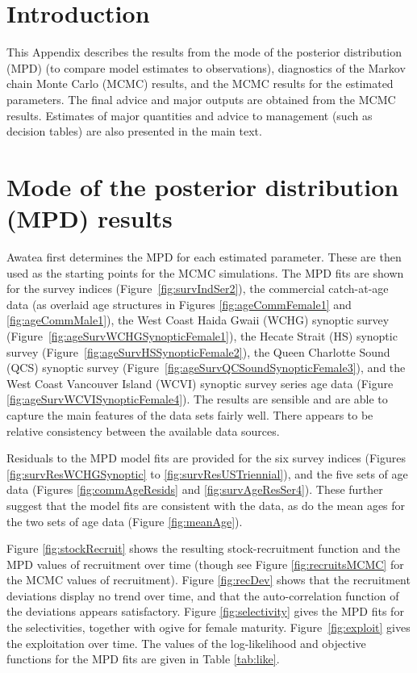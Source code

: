
\section{Introduction}

This Appendix describes the results from the mode of the posterior distribution (MPD) (to compare model estimates to observations), diagnostics of the Markov chain Monte Carlo (MCMC) results, and the MCMC results for the estimated parameters.  The final advice and major outputs are obtained from the MCMC results. Estimates of major quantities and advice to management (such as decision tables) are also presented in the main text.


\section{Mode of the posterior distribution (MPD) results}

Awatea first determines the MPD for each estimated parameter.  These are then used as the starting points for the MCMC simulations. The MPD fits are shown for the survey indices (Figure~\ref{fig:survIndSer2}), the commercial catch-at-age data (as overlaid age structures in Figures \ref{fig:ageCommFemale1} and \ref{fig:ageCommMale1}), the West Coast Haida Gwaii (WCHG) synoptic survey (Figure~\ref{fig:ageSurvWCHGSynopticFemale1}), the Hecate Strait (HS) synoptic survey (Figure~\ref{fig:ageSurvHSSynopticFemale2}), the Queen Charlotte Sound (QCS) synoptic survey (Figure~\ref{fig:ageSurvQCSoundSynopticFemale3}), and the West Coast Vancouver Island (WCVI) synoptic survey series age data (Figure \ref{fig:ageSurvWCVISynopticFemale4}). The results are sensible and are able to capture the main features of the data sets fairly well. There appears to be relative consistency between the available data sources.

Residuals to the MPD model fits are provided for the six survey indices (Figures \ref{fig:survResWCHGSynoptic} to \ref{fig:survResUSTriennial}), and the five sets of age data (Figures \ref{fig:commAgeResids} and \ref{fig:survAgeResSer4}). These further suggest that the model fits are consistent with the data, as do the mean ages for the two sets of age data (Figure \ref{fig:meanAge}).

Figure \ref{fig:stockRecruit} shows the resulting stock-recruitment function and the MPD values of recruitment over time (though see Figure \ref{fig:recruitsMCMC} for the MCMC values of recruitment). Figure \ref{fig:recDev} shows that the recruitment deviations display no trend over time, and that the auto-correlation function of the deviations appears satisfactory. Figure \ref{fig:selectivity} gives the MPD fits for the selectivities, together with ogive for female maturity. Figure~\ref{fig:exploit} gives the exploitation over time. The values of the log-likelihood and objective functions for the MPD fits are given in Table \ref{tab:like}.

